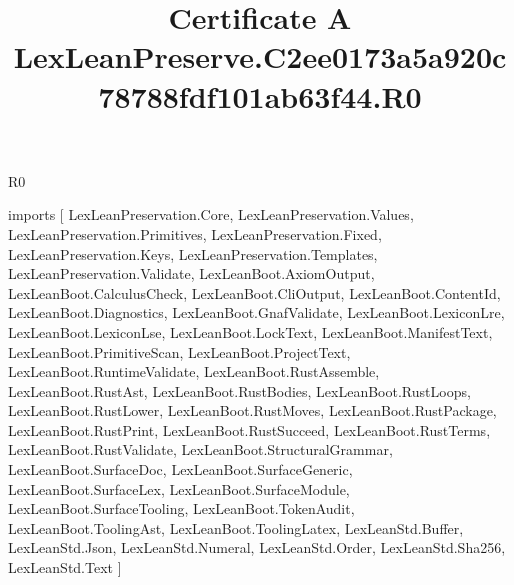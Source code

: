 \begin{lexlean}{R0}
\title{Certificate A LexLeanPreserve.C2ee0173a5a920c78788fdf101ab63f44.R0}
\begin{coremodule}
imports [
  LexLeanPreservation.Core,
  LexLeanPreservation.Values,
  LexLeanPreservation.Primitives,
  LexLeanPreservation.Fixed,
  LexLeanPreservation.Keys,
  LexLeanPreservation.Templates,
  LexLeanPreservation.Validate,
  LexLeanBoot.AxiomOutput,
  LexLeanBoot.CalculusCheck,
  LexLeanBoot.CliOutput,
  LexLeanBoot.ContentId,
  LexLeanBoot.Diagnostics,
  LexLeanBoot.GnafValidate,
  LexLeanBoot.LexiconLre,
  LexLeanBoot.LexiconLse,
  LexLeanBoot.LockText,
  LexLeanBoot.ManifestText,
  LexLeanBoot.PrimitiveScan,
  LexLeanBoot.ProjectText,
  LexLeanBoot.RuntimeValidate,
  LexLeanBoot.RustAssemble,
  LexLeanBoot.RustAst,
  LexLeanBoot.RustBodies,
  LexLeanBoot.RustLoops,
  LexLeanBoot.RustLower,
  LexLeanBoot.RustMoves,
  LexLeanBoot.RustPackage,
  LexLeanBoot.RustPrint,
  LexLeanBoot.RustSucceed,
  LexLeanBoot.RustTerms,
  LexLeanBoot.RustValidate,
  LexLeanBoot.StructuralGrammar,
  LexLeanBoot.SurfaceDoc,
  LexLeanBoot.SurfaceGeneric,
  LexLeanBoot.SurfaceLex,
  LexLeanBoot.SurfaceModule,
  LexLeanBoot.SurfaceTooling,
  LexLeanBoot.TokenAudit,
  LexLeanBoot.ToolingAst,
  LexLeanBoot.ToolingLatex,
  LexLeanStd.Buffer,
  LexLeanStd.Json,
  LexLeanStd.Numeral,
  LexLeanStd.Order,
  LexLeanStd.Sha256,
  LexLeanStd.Text
]


\end{coremodule}
\end{lexlean}
